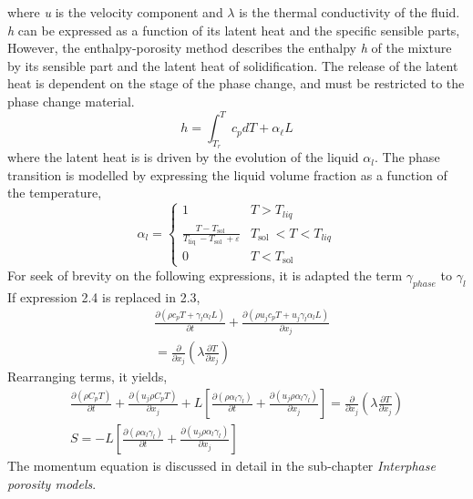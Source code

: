 where \textit{u} is the velocity component and $\lambda$ is the thermal conductivity of the fluid. \textit{h} can be expressed as a function of its latent heat and the specific sensible parts,
\newline
However, the enthalpy-porosity method describes the enthalpy \textit{h} of the mixture by its sensible part and the latent heat of solidification.
The release of the latent heat is dependent on the stage of the phase change, and must be restricted to the phase change material.
\begin{equation}
	h=\int_{T_{r}}^{T} c_{p} d T+\alpha_{\ell} L
	\label{2.4}
\end{equation}
where the latent heat is is driven by the evolution of the liquid $\alpha_{l}$. The phase transition is modelled by expressing the liquid volume fraction as a function of the temperature,
\begin{equation}
	\alpha_{l}= \begin{cases}
		1 & T>T_{l i q} \\ \frac{T-T_{\text {sol }}}{T_{\text {liq }}-T_{\text {sol }}+\varepsilon} & T_{\text {sol }}<T<T_{l i q} \\ 0 & T<T_{\text {sol }}
	\end{cases}
	\label{2.5}
\end{equation}
For seek of brevity on the following expressions, it is adapted the term $\gamma_{phase}$ to $\gamma_{l}$ 
If expression 2.4 is replaced in 2.3,
\begin{equation}
	\begin{aligned}
		&\frac{\partial\left(\rho c_{p} T + \gamma_{l} \alpha_{l} L\right)}{\partial t}+\frac{\partial\left(\rho u_{j} c_{p} T + u_{j}\gamma_{l} \alpha_{l} L\right)}{\partial x_{j}} \\
		&=\frac{\partial}{\partial x_{j}}\left(\lambda \frac{\partial T}{\partial x_{j}}\right) 
	\end{aligned}
	\label{2.6}
\end{equation}
Rearranging terms, it yields,
\begin{equation}
	\begin{aligned}
		\frac{\partial (\rho C_{p} T)}{\partial t}+ \frac{\partial (u_{j}\rho C_{p} T)}{\partial x_{j}}+L\left[\frac{\partial (\rho \alpha_{l}\gamma_{l})}{\partial t}+ \frac{\partial (u_{j}\rho \alpha_{l}\gamma_{l})}{\partial x_{j}}\right]=\frac{\partial}{\partial x_{j}}\left(\lambda \frac{\partial T}{\partial x_{j}}\right)  \\
		S = -L\left[\frac{\partial (\rho \alpha_{l}\gamma_{l})}{\partial t}+ \frac{\partial (u_{j}\rho \alpha_{l}\gamma_{l})}{\partial x_{j}}\right]
	\end{aligned}
	\label{2.7}
\end{equation}
The momentum equation is discussed in detail in the sub-chapter \textit{Interphase porosity models}.

